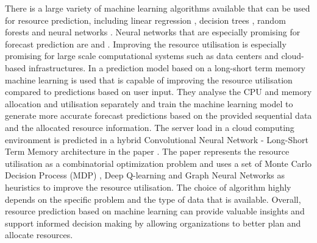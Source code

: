         There is a large variety of machine learning algorithms available that can be used for resource prediction, including linear regression \cite{weisbergAppliedLinearRegression2005}, decision trees \cite{kotsiantisDecisionTreesRecent2013}, random forests \cite{breimanRandomForests2001} and neural networks \cite{andersonIntroductionNeuralNetworks1995}.
        Neural networks that are especially promising for forecast prediction are  and .
        Improving the resource utilisation is especially promising for large scale computational systems such as data centers and cloud-based infrastructures. In \cite{thonglekImprovingResourceUtilization2019} a prediction model based on a long-short term memory machine learning is used that is capable of improving the resource utilisation compared to predictions based on user input.
        They analyse the CPU and memory allocation and utilisation separately and train the machine learning model to generate more accurate forecast predictions based on the provided sequential data and the allocated resource information.
        The server load in a cloud computing environment is predicted in a hybrid Convolutional Neural Network - Long-Short Term Memory architecture in the paper \cite{patelHybridCNNLSTMModel2022}.
        The paper \cite{orenSOLOSearchOnline2021} represents the resource utilisation as a combinatorial optimization problem and uses a set of Monte Carlo Decision Process (MDP) \cite{jamesMonteCarloTheory1980}, Deep Q-learning and Graph Neural Networks as heuristics to improve the resource utilisation.
        The choice of algorithm highly depends on the specific problem and the type of data that is available.
        Overall, resource prediction based on machine learning can provide valuable insights and support informed decision making by allowing organizations to better plan and allocate resources.


    


            